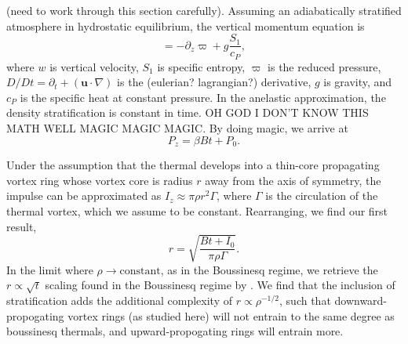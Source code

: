 \documentclass[twocolumn, amsmath, amsfonts, amssymb, trackchanges]{aastex62}
\newcommand{\grad}{\ensuremath{\nabla}}
\begin{document}
(need to work through this section carefully).
Assuming an adiabatically stratified atmosphere in
hydrostatic equilibrium, the vertical momentum equation is
\begin{equation}
 = - \partial_z \varpi +  g\frac{S_1}{c_P},
\label{eqn:buoyancy}
\end{equation}
where $w$ is vertical velocity, $S_1$ is specific entropy, $\varpi$ is the reduced pressure,
$D/Dt = \partial_t + (\bm{u}\cdot\grad)$ is the (eulerian? lagrangian?)
derivative, $g$ is gravity, and $c_P$ is the specific heat at constant pressure.
In the anelastic approximation, the density stratification is constant in time. 
OH GOD I DON'T KNOW THIS MATH WELL MAGIC MAGIC MAGIC.
By doing magic, we arrive at
\begin{equation}
P_z = \beta B t + P_0.
\end{equation}

Under the assumption that the thermal develops into a thin-core 
propagating vortex ring whose vortex core is radius $r$ away from the axis of symmetry, 
the impulse can be approximated as $I_z \approx \pi \rho r^2 \Gamma$, where 
$\Gamma$ is the circulation of the thermal vortex, which we assume to be constant. 
Rearranging, we find our first result,
\begin{equation}
r = \sqrt{\frac{B t + I_0}{\pi\rho\Gamma}}.
\label{eqn:r_theory}
\end{equation}
In the limit where $\rho \rightarrow \text{constant}$, as in the Boussinesq regime,
we retrieve the $r \propto \sqrt{t}$ scaling found in the Boussinesq regime by
\citet{lecoanet&jeevanjee2018}. We find that the inclusion of stratification adds the
additional complexity of $r \propto \rho^{-1/2}$, such that downward-propogating 
vortex rings (as studied here) will not entrain to the same degree as boussinesq thermals,
and upward-propogating rings will entrain more.
\end{document}
